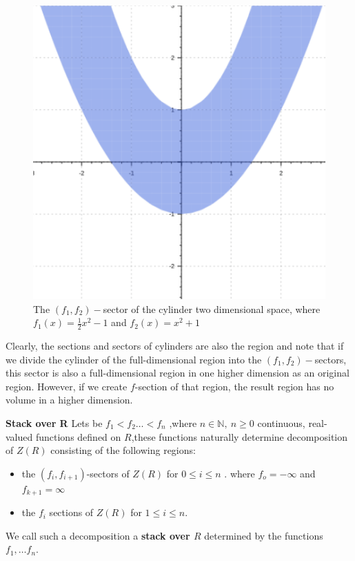 \documentclass[
  digital, %
  twoside, %
  table,   %
  nolof,     %
  nolot,     %
]{fithesis3}
\begin{document}
\begin{figure}[H]
  \begin{center}
      \begin{minipage}{.33\textwidth}
          \includegraphics[width=\textwidth]{fithesis/images/sector.png}
    \end{minipage}
  \end{center}
  \caption{The $(f_1, f_2)-$sector of the cylinder two dimensional space, where $f_1(x) = \frac{1}{2}x^2 - 1$ and $f_2(x) = x^2 + 1$}
\end{figure}
Clearly, the sections and sectors of cylinders are also the region and note that if we divide the cylinder of the full-dimensional region into the $(f_1, f_2)-$sectors, this sector is also a full-dimensional region in one higher dimension as an original region. However, if we create  $f$-section of that region, the result region has no volume in a higher dimension.

\begin{definition}{\textbf{Stack over R}}
\newline
Lets be $ f_1 < f_2 \dots < f_n$ ,where $n \in \mathbb{N},\  n \geq 0$ continuous, real-valued functions
defined on $R$,these functions naturally determine decomposition of $Z(R)$ consisting of the following regions:
\begin{itemize}
  \itemsep0em 
    \item the $(f_i,f_{i+1})$-sectors of $Z(R)$ for $0 \leq i \leq n$ . where $f_o =  -\infty$ and $f_{k + 1} =  \infty$
    \item the $f_i$ sections of $Z (R)$ for $1 \leq i \leq n$.
\end{itemize}
    We call such a decomposition a \textbf{stack over $R$} determined by the functions $f_1, \dots f_n$.
\end{definition}
\end{document}
